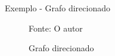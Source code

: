 \begin{frame}{Exemplo - Grafo direcionado}
    \begin{figure}[htbp]
        \centering
        
        \caption[Grafo Direcionado]{Grafo direcionado}
        \small{Fonte: O autor}
        \label{fig:Grafo1}
    \end{figure}
\end{frame}
